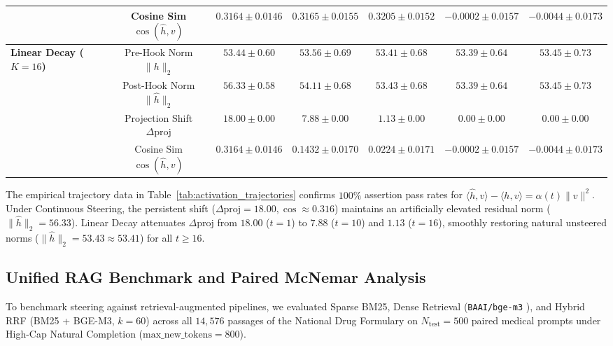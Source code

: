 \documentclass[conference]{IEEEtran}
\begin{document}
\begin{table}[htbp]
\begin{tabular}{lcccccc}
 & Cosine Sim $\cos(\hat{h}, v)$ & $0.3164 \pm 0.0146$ & $0.3165 \pm 0.0155$ & $0.3205 \pm 0.0152$ & $-0.0002 \pm 0.0157$ & $-0.0044 \pm 0.0173$ \\
\midrule
\multirow{4}{*}{\textbf{Linear Decay ($K=16$)}} 
 & Pre-Hook Norm $\|h\|_2$ & $53.44 \pm 0.60$ & $53.56 \pm 0.69$ & $53.41 \pm 0.68$ & $53.39 \pm 0.64$ & $53.45 \pm 0.73$ \\
 & Post-Hook Norm $\|\hat{h}\|_2$ & $56.33 \pm 0.58$ & $54.11 \pm 0.68$ & $53.43 \pm 0.68$ & $53.39 \pm 0.64$ & $53.45 \pm 0.73$ \\
 & Projection Shift $\Delta \text{proj}$ & $18.00 \pm 0.00$ & $7.88 \pm 0.00$ & $1.13 \pm 0.00$ & $0.00 \pm 0.00$ & $0.00 \pm 0.00$ \\
 & Cosine Sim $\cos(\hat{h}, v)$ & $0.3164 \pm 0.0146$ & $0.1432 \pm 0.0170$ & $0.0224 \pm 0.0171$ & $-0.0002 \pm 0.0157$ & $-0.0044 \pm 0.0173$ \\
\bottomrule
\end{tabular}
\end{table}

The empirical trajectory data in Table~\ref{tab:activation_trajectories} confirms $100\%$ assertion pass rates for $\langle \hat{h}, v \rangle - \langle h, v \rangle = \alpha(t) \|v\|^2$. Under Continuous Steering, the persistent shift ($\Delta \text{proj}=18.00, \cos \approx 0.316$) maintains an artificially elevated residual norm ($\|\hat{h}\|_2 = 56.33$). Linear Decay attenuates $\Delta \text{proj}$ from $18.00$ ($t=1$) to $7.88$ ($t=10$) and $1.13$ ($t=16$), smoothly restoring natural unsteered norms ($\|\hat{h}\|_2 = 53.43 \approx 53.41$) for all $t \ge 16$.

\subsection{Unified RAG Benchmark and Paired McNemar Analysis}
\label{sec:dense_hybrid_rag}
To benchmark steering against retrieval-augmented pipelines, we evaluated Sparse BM25, Dense Retrieval (\texttt{BAAI/bge-m3} \cite{chen2024bge}), and Hybrid RRF (BM25 + BGE-M3, $k=60$) across all $14,576$ passages of the National Drug Formulary on $N_{\text{test}}=500$ paired medical prompts under High-Cap Natural Completion ($\text{max\_new\_tokens}=800$).
\end{document}
